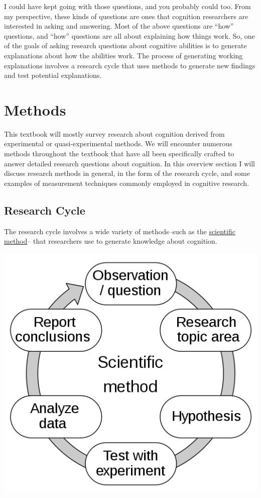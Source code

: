 \documentclass[
  oneside,
  12pt]{crumpbook}
\newenvironment{floatright50}{%
  \wrapfigure{R}{.5\textwidth}%
  }{%
  \endwrapfigure}
\begin{document}
I could have kept going with those questions, and you probably could too. From my perspective, these kinds of questions are ones that cognition researchers are interested in asking and answering. Most of the above questions are ``how'' questions, and ``how'' questions are all about explaining how things work. So, one of the goals of asking research questions about cognitive abilities is to generate explanations about how the abilities work. The process of generating working explanations involves a research cycle that uses methods to generate new findings and test potential explanations.

\hypertarget{methods}{%
\section{Methods}\label{methods}}

This textbook will mostly survey research about cognition derived from experimental or quasi-experimental methods. We will encounter numerous methods throughout the textbook that have all been specifically crafted to answer detailed research questions about cognition. In this overview section I will discuss research methods in general, in the form of the research cycle, and some examples of measurement techniques commonly employed in cognitive research.

\hypertarget{research-cycle}{%
\subsection{Research Cycle}\label{research-cycle}}

The research cycle involves a wide variety of methods--such as the \href{https://en.wikipedia.org/wiki/Scientific_method}{scientific method}-- that researchers use to generate knowledge about cognition.

\begin{floatright50}
\includegraphics[width=1\linewidth]{imgs/The_Scientific_Method}

\end{floatright50}
\end{document}
